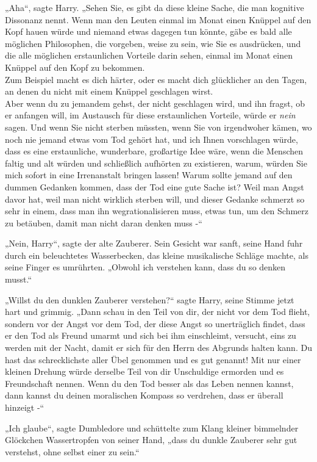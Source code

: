 {„Aha“, sagte Harry. „Sehen Sie, es gibt da diese kleine Sache, die man kognitive Dissonanz nennt. Wenn man den Leuten einmal im Monat einen Knüppel auf den Kopf hauen würde und niemand etwas dagegen tun könnte, gäbe es bald alle möglichen Philosophen, die vorgeben, weise zu sein, wie Sie es ausdrücken, und die alle möglichen erstaunlichen Vorteile darin sehen, einmal im Monat einen Knüppel auf den Kopf zu bekommen.\\ Zum Beispiel macht es dich härter, oder es macht dich glücklicher an den Tagen, an denen du nicht mit einem Knüppel geschlagen wirst.\\ Aber wenn du zu jemandem gehst, der nicht geschlagen wird, und ihn fragst, ob er anfangen will, im Austausch für diese erstaunlichen Vorteile, würde er \emph{nein} sagen. Und wenn Sie nicht sterben müssten, wenn Sie von irgendwoher kämen, wo noch nie jemand etwas vom Tod gehört hat, und ich Ihnen vorschlagen würde, dass es eine erstaunliche, wunderbare, großartige Idee wäre, wenn die Menschen faltig und alt würden und schließlich aufhörten zu existieren, warum, würden Sie mich sofort in eine Irrenanstalt bringen lassen! Warum sollte jemand auf den dummen Gedanken kommen, dass der Tod eine gute Sache ist? Weil man Angst davor hat, weil man nicht wirklich sterben will, und dieser Gedanke schmerzt so sehr in einem, dass man ihn wegrationalisieren muss, etwas tun, um den Schmerz zu betäuben, damit man nicht daran denken muss -“

„Nein, Harry“, sagte der alte Zauberer. Sein Gesicht war sanft, seine Hand fuhr durch ein beleuchtetes Wasserbecken, das kleine musikalische Schläge machte, als seine Finger es umrührten. „Obwohl ich verstehen kann, dass du so denken musst.“

„Willst du den dunklen Zauberer verstehen?“ sagte Harry, seine Stimme jetzt hart und grimmig. „Dann schau in den Teil von dir, der nicht vor dem Tod flieht, sondern vor der Angst vor dem Tod, der diese Angst so unerträglich findet, dass er den Tod als Freund umarmt und sich bei ihm einschleimt, versucht, eins zu werden mit der Nacht, damit er sich für den Herrn des Abgrunds halten kann. Du hast das schrecklichste aller Übel genommen und es gut genannt! Mit nur einer kleinen Drehung würde derselbe Teil von dir Unschuldige ermorden und es Freundschaft nennen. Wenn du den Tod besser als das Leben nennen kannst, dann kannst du deinen moralischen Kompass so verdrehen, dass er überall hinzeigt -“

„Ich glaube“, sagte Dumbledore und schüttelte zum Klang kleiner bimmelnder Glöckchen Wassertropfen von seiner Hand, „dass du dunkle Zauberer sehr gut verstehst, ohne selbst einer zu sein.“

}
